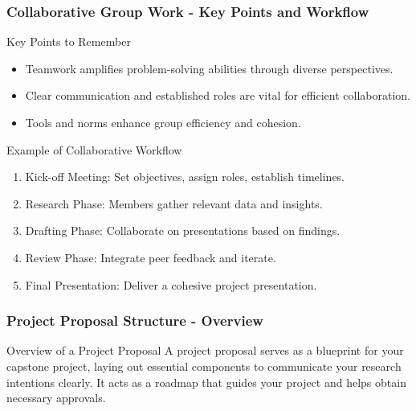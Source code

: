 \documentclass[aspectratio=169]{beamer}
\begin{document}
\begin{frame}[fragile]
    \frametitle{Collaborative Group Work - Key Points and Workflow}
    \begin{block}{Key Points to Remember}
        \begin{itemize}
            \item Teamwork amplifies problem-solving abilities through diverse perspectives.
            \item Clear communication and established roles are vital for efficient collaboration.
            \item Tools and norms enhance group efficiency and cohesion.
        \end{itemize}
    \end{block}

    \begin{block}{Example of Collaborative Workflow}
        \begin{enumerate}
            \item Kick-off Meeting: Set objectives, assign roles, establish timelines.
            \item Research Phase: Members gather relevant data and insights.
            \item Drafting Phase: Collaborate on presentations based on findings.
            \item Review Phase: Integrate peer feedback and iterate.
            \item Final Presentation: Deliver a cohesive project presentation.
        \end{enumerate}
    \end{block}
\end{frame}

\begin{frame}[fragile]
    \frametitle{Project Proposal Structure - Overview}
    \begin{block}{Overview of a Project Proposal}
        A project proposal serves as a blueprint for your capstone project, laying out essential components to communicate your research intentions clearly. It acts as a roadmap that guides your project and helps obtain necessary approvals.
    \end{block}
\end{frame}
\end{document}
